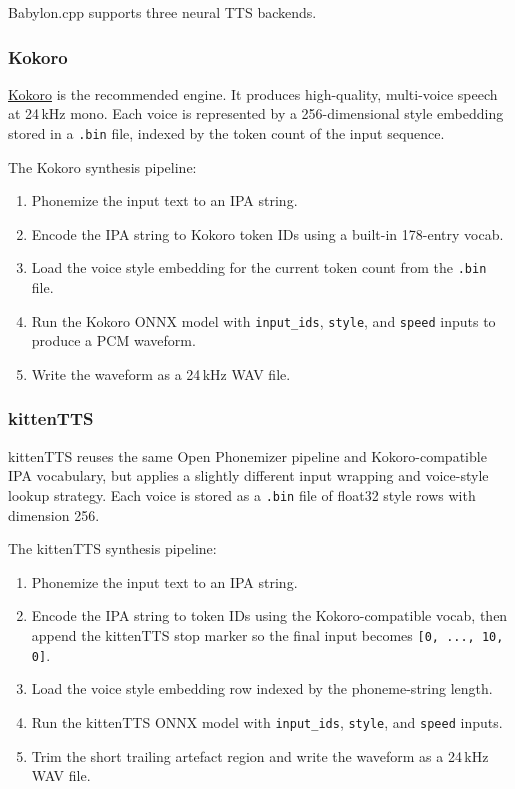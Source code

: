 \documentclass[12pt,a4paper]{article}
\begin{document}
Babylon.cpp supports three neural TTS backends.

\subsubsection{Kokoro}

\href{https://github.com/hexgrad/kokoro}{Kokoro} is the recommended engine. It produces high-quality, multi-voice speech at 24\,kHz mono. Each voice is represented by a 256-dimensional style embedding stored in a \texttt{.bin} file, indexed by the token count of the input sequence.

The Kokoro synthesis pipeline:

\begin{enumerate}
    \item Phonemize the input text to an IPA string.
    \item Encode the IPA string to Kokoro token IDs using a built-in 178-entry vocab.
    \item Load the voice style embedding for the current token count from the \texttt{.bin} file.
    \item Run the Kokoro ONNX model with \texttt{input\_ids}, \texttt{style}, and \texttt{speed} inputs to produce a PCM waveform.
    \item Write the waveform as a 24\,kHz WAV file.
\end{enumerate}

\subsubsection{kittenTTS}

kittenTTS reuses the same Open Phonemizer pipeline and Kokoro-compatible IPA vocabulary, but applies a slightly different input wrapping and voice-style lookup strategy. Each voice is stored as a \texttt{.bin} file of float32 style rows with dimension 256.

The kittenTTS synthesis pipeline:

\begin{enumerate}
    \item Phonemize the input text to an IPA string.
    \item Encode the IPA string to token IDs using the Kokoro-compatible vocab, then append the kittenTTS stop marker so the final input becomes \texttt{[0, ..., 10, 0]}.
    \item Load the voice style embedding row indexed by the phoneme-string length.
    \item Run the kittenTTS ONNX model with \texttt{input\_ids}, \texttt{style}, and \texttt{speed} inputs.
    \item Trim the short trailing artefact region and write the waveform as a 24\,kHz WAV file.
\end{enumerate}
\end{document}
